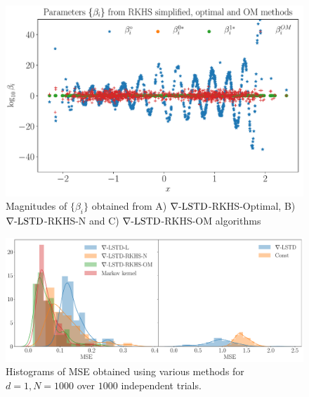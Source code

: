 \begin{figure}
	\centering
	\includegraphics[width=5in]{images/Chap4_beta_comparison}
	\caption[Comparison of parameter magnitudes using the various algorithms]{Magnitudes of $\{\beta_i\}$ obtained from A) $\nabla\text{-LSTD}$-RKHS-Optimal, B) $\nabla\text{-LSTD}$-RKHS-N and C) $\nabla\text{-LSTD}$-RKHS-OM algorithms}
	\label{fig:beta_comparison}
\end{figure}

\begin{figure}
	\centering
	\includegraphics[width=6in]{images/Chap4_hist_mse_d1_runs100}
	\caption[Histograms of MSEs obtained over $1000$ trials]{Histograms of MSE obtained using various methods for $d=1,N=1000$ over $1000$ independent trials.}
	\label{fig:hist_mse}
\end{figure}


